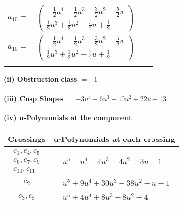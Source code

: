 \documentclass[1p]{elsarticle_modified}
\theoremstyle{definition}
\begin{document}
\begin{tabular}{m{7pt} m{180pt} m{7pt} m{180pt} }
\flushright $a_{10}=$&$\begin{pmatrix}-\frac{1}{2} u^4-\frac{1}{2} u^3+\frac{3}{2} u^2+\frac{5}{2} u\\\frac{1}{2} u^3+\frac{1}{2} u^2-\frac{3}{2} u+\frac{1}{2}\end{pmatrix}$\\ \flushright $a_{10}=$&$\begin{pmatrix}-\frac{1}{2} u^4-\frac{1}{2} u^3+\frac{3}{2} u^2+\frac{5}{2} u\\\frac{1}{2} u^3+\frac{1}{2} u^2-\frac{3}{2} u+\frac{1}{2}\end{pmatrix}$\\&\end{tabular}
\flushleft \textbf{(ii) Obstruction class $= -1$}\\~\\
\flushleft \textbf{(iii) Cusp Shapes $= -3 u^4-6 u^3+10 u^2+22 u-13$}\\~\\
\newpage\renewcommand{\arraystretch}{1}
\flushleft \textbf{(iv) u-Polynomials at the component}\newline \\
\begin{tabular}{m{50pt}|m{274pt}}
Crossings & \hspace{64pt}u-Polynomials at each crossing \\
\hline $$\begin{aligned}c_{1},c_{4},c_{5}\\c_{6},c_{7},c_{9}\\c_{10},c_{11}\end{aligned}$$&$\begin{aligned}
&u^5- u^4-4 u^3+4 u^2+3 u+1
\end{aligned}$\\
\hline $$\begin{aligned}c_{2}\end{aligned}$$&$\begin{aligned}
&u^5+9 u^4+30 u^3+38 u^2+u+1
\end{aligned}$\\
\hline $$\begin{aligned}c_{3},c_{8}\end{aligned}$$&$\begin{aligned}
&u^5+4 u^4+8 u^3+8 u^2+4
\end{aligned}$\\
\hline
\end{tabular}\\~\\
\end{document}
